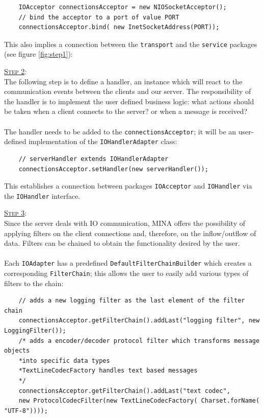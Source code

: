 \begin{verbatim}
    IOAcceptor connectionsAcceptor = new NIOSocketAcceptor();
    // bind the acceptor to a port of value PORT
    connectionsAcceptor.bind( new InetSocketAddress(PORT));
\end{verbatim}

This also implies a connection between the \texttt{transport} and the \texttt{service} packages (see figure \ref{fig:step1}):



\underline{\textsc{Step 2}}:\\
The following step is to define a handler, an instance which will react to the communication events between the clients and our server. The responsibility of the handler is to implement the user defined business logic: what actions should be taken when a client connects to the server? or when a message is received?\\\\
The handler needs to be added to the \texttt{connectionsAcceptor}; it will be an user-defined implementation of the \texttt{IOHandlerAdapter} class:

\begin{verbatim}
    // serverHandler extends IOHandlerAdapter
    connectionsAcceptor.setHandler(new serverHandler());
\end{verbatim}

This establishes a connection between packages \texttt{IOAcceptor} and \texttt{IOHandler} via the \texttt{IOHandler} interface.

\underline{\textsc{Step 3}}:\\
Since the server deals with IO communication, MINA offers the possibility of applying filters on the client connections and, therefore, on the inflow/outflow of data. Filters can be chained to obtain the functionality desired by the user.\\\\
Each \texttt{IOAdapter} has a predefined \texttt{DefaultFilterChainBuilder} which creates a corresponding \texttt{FilterChain}; this allows the user to easily add various types of filters to the chain:

\begin{verbatim}
    // adds a new logging filter as the last element of the filter chain
    connectionsAcceptor.getFilterChain().addLast("logging filter", new LoggingFilter());
    /* adds a encoder/decoder protocol filter which transforms message objects 
    *into specific data types
    *TextLineCodecFactory handles text based messages 
    */
    connectionsAcceptor.getFilterChain().addLast("text codec", 
    new ProtocolCodecFilter(new TextLineCodecFactory( Charset.forName( "UTF-8"))));
\end{verbatim}

